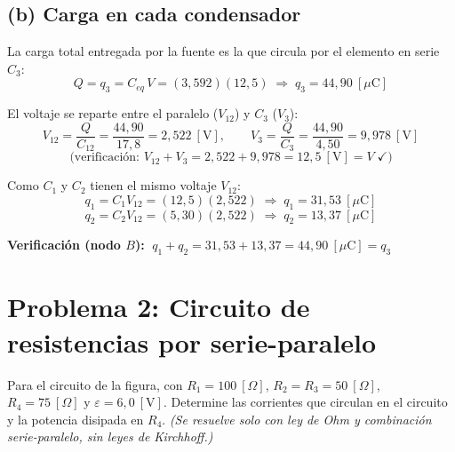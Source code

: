 \documentclass[12pt,letterpaper]{article}
\begin{document}
\subsection*{(b) Carga en cada condensador}
La carga total entregada por la fuente es la que circula por el elemento en serie $C_3$:
\[
    Q = q_3 = C_{eq}\,V = (3{,}592)(12{,}5) \;\Rightarrow\; \boxed{q_3 = 44{,}90\ [\mu\text{C}]}
\]

\noindent El voltaje se reparte entre el paralelo ($V_{12}$) y $C_3$ ($V_3$):
\[
    V_{12} = \frac{Q}{C_{12}} = \frac{44{,}90}{17{,}8} = 2{,}522\ [\text{V}],
    \qquad
    V_3 = \frac{Q}{C_3} = \frac{44{,}90}{4{,}50} = 9{,}978\ [\text{V}]
\]
\[
    \text{(verificaci\'on: } V_{12}+V_3 = 2{,}522 + 9{,}978 = 12{,}5\ [\text{V}] = V \;\checkmark)
\]

\noindent Como $C_1$ y $C_2$ tienen el mismo voltaje $V_{12}$:
\[
    q_1 = C_1 V_{12} = (12{,}5)(2{,}522) \;\Rightarrow\; \boxed{q_1 = 31{,}53\ [\mu\text{C}]}
\]
\[
    q_2 = C_2 V_{12} = (5{,}30)(2{,}522) \;\Rightarrow\; \boxed{q_2 = 13{,}37\ [\mu\text{C}]}
\]

\noindent\textbf{Verificaci\'on (nodo $B$):} $\;q_1 + q_2 = 31{,}53 + 13{,}37 = 44{,}90\ [\mu\text{C}] = q_3$ \checkmark

\newpage

\section*{Problema 2: Circuito de resistencias por serie-paralelo}

\noindent Para el circuito de la figura, con $R_1 = 100\ [\Omega]$, $R_2 = R_3 = 50\ [\Omega]$,
$R_4 = 75\ [\Omega]$ y $\varepsilon = 6{,}0\ [\text{V}]$. Determine las corrientes que circulan
en el circuito y la potencia disipada en $R_4$. \emph{(Se resuelve solo con ley de Ohm y
combinaci\'on serie-paralelo, sin leyes de Kirchhoff.)}

\medskip
\end{document}
